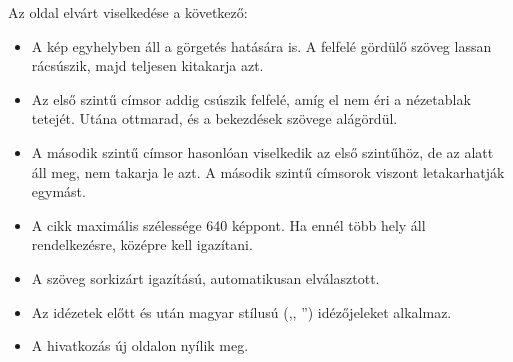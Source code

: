 \begin{frame}
  Az oldal elvárt viselkedése a következő:
  \begin{itemize}
    \item A kép egyhelyben áll a görgetés hatására is. A felfelé gördülő szöveg lassan rácsúszik, majd teljesen kitakarja azt.
    \item Az első szintű címsor addig csúszik felfelé, amíg el nem éri a nézetablak tetejét. Utána ottmarad, és a bekezdések szövege alágördül.
    \item A második szintű címsor hasonlóan viselkedik az első szintűhöz, de az alatt áll meg, nem takarja le azt. A második szintű címsorok viszont letakarhatják egymást.
    \item A cikk maximális szélessége 640 képpont. Ha ennél több hely áll rendelkezésre, középre kell igazítani.
    \item A szöveg sorkizárt igazítású, automatikusan elválasztott.
    \item Az idézetek előtt és után magyar stílusú (,, '') idézőjeleket alkalmaz.
    \item A hivatkozás új oldalon nyílik meg.
  \end{itemize}
\end{frame}
